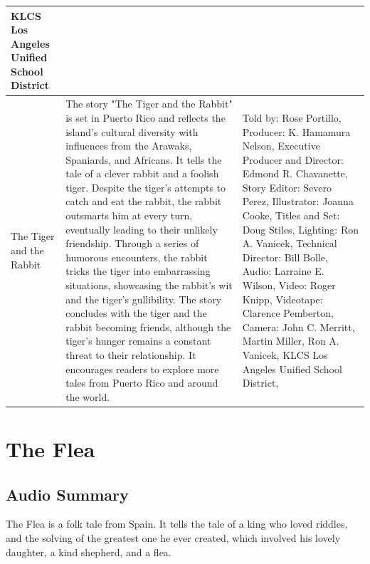 \begin{table}[h]
\begin{small}
\begin{tabular}{|p{1.5cm}|p{8.5cm}|p{7cm}|}
            KLCS Los Angeles Unified School District
            \\
            \hline
            The Tiger and the Rabbit
                                 &
            The story "The Tiger and the Rabbit" is set in Puerto Rico and reflects the island's cultural diversity with influences from the Arawaks, Spaniards, and Africans.
            It tells the tale of a clever rabbit and a foolish tiger.
            Despite the tiger's attempts to catch and eat the rabbit, the rabbit outsmarts him at every turn, eventually leading to their unlikely friendship.
            Through a series of humorous encounters, the rabbit tricks the tiger into embarrassing situations, showcasing the rabbit's wit and the tiger's gullibility.
            The story concludes with the tiger and the rabbit becoming friends, although the tiger's hunger remains a constant threat to their relationship.
            It encourages readers to explore more tales from Puerto Rico and around the world.
                                 &
            Told by: Rose Portillo,
            Producer: K. Hamamura Nelson,
            Executive Producer and Director: Edmond R. Chavanette,
            Story Editor: Severo Perez,
            Illustrator: Joanna Cooke,
            Titles and Set: Doug Stiles,
            Lighting: Ron A. Vanicek,
            Technical Director: Bill Bolle,
            Audio: Larraine E. Wilson,
            Video: Roger Knipp,
            Videotape: Clarence Pemberton,
            Camera: John C. Merritt, Martin Miller, Ron A. Vanicek,
            KLCS Los Angeles Unified School District,
            \\
            \hline
        \end{tabular}
    \end{small}

\end{table}

\clearpage
\newpage

\section{The Flea}

\subsection{Audio Summary}

The Flea is a folk tale from Spain.
It tells the tale of a king who loved riddles, and the solving of the greatest one he ever created, which involved his lovely daughter, a kind shepherd, and a flea.

